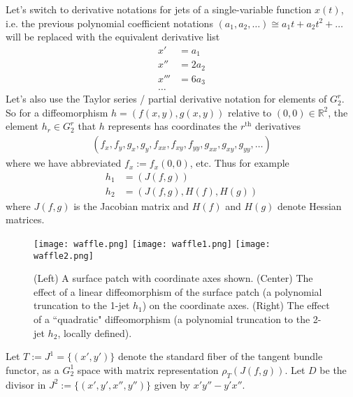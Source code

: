 \documentclass[12pt]{article}
\numberwithin{equation}{section}
\theoremstyle{plain}
\theoremstyle{definition}
\newcommand{\R}{\mathbb{R}}
\begin{document}
Let's switch to derivative notations for jets of a single-variable function $x(t)$, i.e. the previous polynomial coefficient notations $(a_1,a_2,\dots)\cong a_1t+a_2t^2 +\dots$ will be replaced with the equivalent derivative list
\begin{align*}
x' &= a_1\\
x''&=2a_2\\
x'''&=6a_3\\
\dots
\end{align*}
Let's also use the Taylor series / partial derivative notation for elements of $G^{r}_{2}$. So for a diffeomorphism $h=(f(x,y),g(x,y))$ relative to $(0,0)\in \R^{2}$, the element $h_r \in G^{r}_{2}$ that $h$ represents has coordinates the $r^{\text{th}}$ derivatives
\begin{align*}
(f_x,f_y,g_x,g_y,f_{xx},f_{xy},f_{yy},g_{xx},g_{xy},g_{yy},\dots)
\end{align*}
where we have abbreviated $f_x:=f_x(0,0)$, etc. Thus for example
\begin{align*}
h_1 &= (J(f,g))\\
h_2 &=(J(f,g),H(f),H(g))
\end{align*}
where $J(f,g)$ is the Jacobian matrix and $H(f)$ and $H(g)$ denote Hessian matrices.
\begin{figure}[H]
 \centering
   \texttt{[image: waffle.png]}
   \texttt{[image: waffle1.png]}
   \texttt{[image: waffle2.png]}
   \caption{(Left) A surface patch with coordinate axes shown.\newline
   (Center) The effect of a linear diffeomorphism of the surface patch (a polynomial truncation to the 1-jet $h_1$) on the coordinate axes. \newline (Right) The effect of a ``quadratic" diffeomorphism (a polynomial truncation to the 2-jet $h_2$, locally defined).}
\end{figure}
Let $T:=J^{1}=\{(x',y')\}$ denote the standard fiber of the tangent bundle functor, as a $G^{1}_{2}$ space with matrix representation $\rho_{T}(J(f,g))$. Let $D$ be the divisor in $J^{2}:=\{(x',y',x'',y'')\}$ given by $x'y''-y'x''$.
\end{document}
